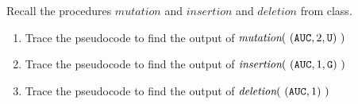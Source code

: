 
Recall the procedures $mutation$ and $insertion$ and $deletion$ from class.
\begin{enumerate}
    \item Trace the pseudocode to find the output of $\textit{mutation}(~ (\texttt{A}\texttt{U}\texttt{C}, 2, \texttt{U}) ~)$
    \item Trace the pseudocode to find the output of $\textit{insertion}(~(\texttt{A}\texttt{U}\texttt{C}, 1, \texttt{G})~)$
    \item Trace the pseudocode to find the output of $\textit{deletion}(~(\texttt{A}\texttt{U}\texttt{C}, 1)~)$
\end{enumerate}